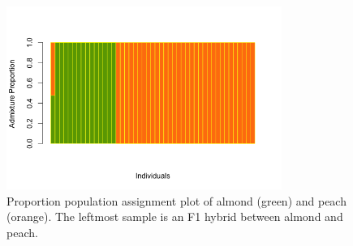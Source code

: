 \documentclass[12pt]{article}
\newcommand{\beginsupplement}{%
        \setcounter{table}{0}
        \renewcommand{\thetable}{S\arabic{table}}%
        \setcounter{figure}{0}
        \renewcommand{\thefigure}{S\arabic{figure}}%
     }
\begin{document}
%
\pagebreak
\begin{figure}[b]
\centering
   \includegraphics[width=0.8\textwidth]{Admixture_test.png}
  \caption{Proportion population assignment plot of almond (green) and peach (orange). The leftmost sample is an F1 hybrid between almond and peach.}
  \label{fig:admix}
\end{figure}
%
\pagebreak
\beginsupplement
\end{document}
